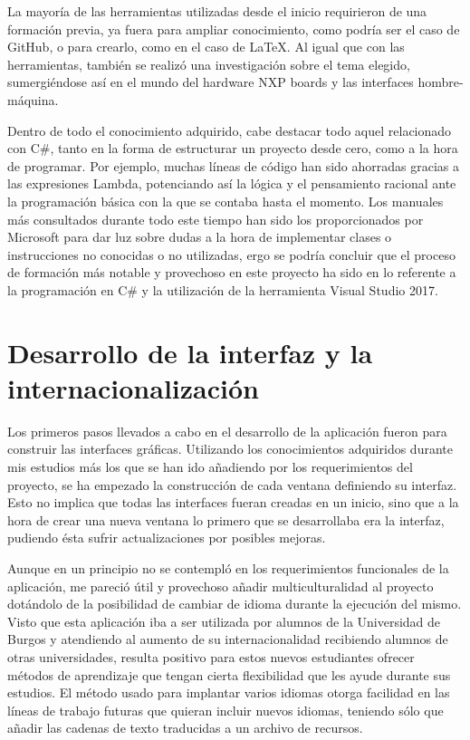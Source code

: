 La mayoría de las herramientas utilizadas desde el inicio requirieron de una formación previa, ya fuera para ampliar conocimiento, como podría ser el caso de GitHub, o para crearlo, como en el caso de \LaTeX. Al igual que con las herramientas, también se realizó una investigación sobre el tema elegido, sumergiéndose así en el mundo del hardware NXP boards y las interfaces hombre-máquina.

Dentro de todo el conocimiento adquirido, cabe destacar todo aquel relacionado con C\#, tanto en la forma de estructurar un proyecto desde cero, como a la hora de programar. Por ejemplo, muchas líneas de código han sido ahorradas gracias a las expresiones Lambda, potenciando así la lógica y el pensamiento racional ante la programación básica con la que se contaba hasta el momento. Los manuales más consultados durante todo este tiempo han sido los proporcionados por Microsoft para dar luz sobre dudas a la hora de implementar clases o instrucciones no conocidas o no utilizadas, ergo se podría concluir que el proceso de formación más notable y provechoso en este proyecto ha sido en lo referente a la programación en C\# y la utilización de la herramienta Visual Studio 2017.

\section{Desarrollo de la interfaz y la internacionalización}

Los primeros pasos llevados a cabo en el desarrollo de la aplicación fueron para construir las interfaces gráficas. Utilizando los conocimientos adquiridos durante mis estudios más los que se han ido añadiendo por los requerimientos del proyecto, se ha empezado la construcción de cada ventana definiendo su interfaz. Esto no implica que todas las interfaces fueran creadas en un inicio, sino que a la hora de crear una nueva ventana lo primero que se desarrollaba era la interfaz, pudiendo ésta sufrir actualizaciones por posibles mejoras.

Aunque en un principio no se contempló en los requerimientos funcionales de la aplicación, me pareció útil y provechoso añadir multiculturalidad al proyecto dotándolo de la posibilidad de cambiar de idioma durante la ejecución del mismo. Visto que esta aplicación iba a ser utilizada por alumnos de la Universidad de Burgos y atendiendo al aumento de su internacionalidad recibiendo alumnos de otras universidades, resulta positivo para estos nuevos estudiantes ofrecer métodos de aprendizaje que tengan cierta flexibilidad que les ayude durante sus estudios. El método usado para implantar varios idiomas otorga facilidad en las líneas de trabajo futuras que quieran incluir nuevos idiomas, teniendo sólo que añadir las cadenas de texto traducidas a un archivo de recursos.

